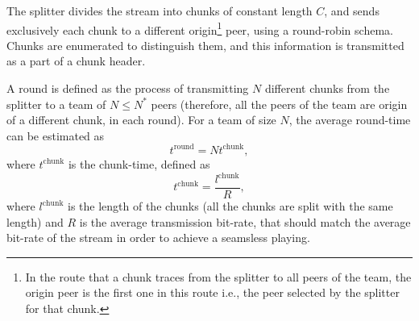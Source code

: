 

\label{sec:feeding_the_team}

The splitter divides the stream into chunks of constant length $C$,
and sends exclusively each chunk to a different
\gls{origin}\footnote{In the route that a chunk traces from the
  splitter to all peers of the team, the origin peer is the first one
  in this route i.e., the peer selected by the splitter for that
  chunk.}  peer, using a round-robin schema. Chunks are enumerated to
distinguish them, and this information is transmitted as a part of a chunk
header.

\begin{comment}
More details about the implementation
are available in Fig.~\ref{fig:chunk_generation}.


\begin{figure*}
  \fig{500}{5cm}{DBS_splitter_feed} \caption{Chunk
    generation at the splitter and their transmission to the
    team.\label{fig:chunk_generation}}
\end{figure*}
\end{comment}

A \gls{round} is defined as the process of transmitting $N$ different
chunks from the splitter to a team of $N\leq N^*$ peers (therefore,
all the peers of the team are origin of a different chunk, in each
round). For a team of size $N$, the average \gls{round-time} can be
estimated as
\begin{equation}
  t^{\mathrm{round}}=Nt^{\mathrm{chunk}},
\end{equation}
where $t^{\mathrm{chunk}}$ is the \gls{chunk-time}, defined as
\begin{equation}
  \label{eq:chunk_time}
  t^{\mathrm{chunk}}=\frac{l^{\mathrm{chunk}}}{R},
\end{equation}
where $l^{\mathrm{chunk}}$ is the length of the chunks (all the chunks are
split with the same length) and $R$ is the average transmission
bit-rate, that should match the average bit-rate of the stream in
order to achieve a seamsless playing.

\begin{comment}
The round-time is defined by:
\begin{equation}
  \cal{r} = \cal{c}N.
  \label{eq:round_time}
\end{equation}
For example, if we use only one team of $N=256$ peers, a chunk size
$C=1024$~bytes, and a video of $1$~Mb/s, the round time is
\begin{displaymath}
  \cal{r} = \frac{1024\frac{\text{bytes}}{\text{chunk}}\times
    8\frac{\text{bits}}{\text{byte}}}{10^6\frac{\text{bits}}{\text{second}}}\times
  256 \approx 2.1~\text{seconds}.
\end{displaymath}
\end{comment}
